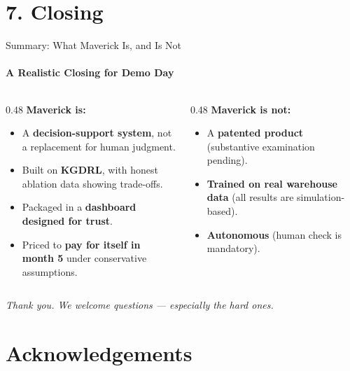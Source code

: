 \documentclass{beamer}
\begin{document}
\section{7. Closing}

\begin{frame}{Summary: What Maverick Is, and Is Not}
  \framesubtitle{A Realistic Closing for Demo Day}
  \small

  \begin{columns}
    \begin{column}{0.48\textwidth}
      \textbf{Maverick \color{deepgreen}is:}
      \begin{itemize}
        \item A \textbf{decision-support system}, not a replacement for human judgment.
        \item Built on \textbf{KGDRL}, with honest ablation data showing trade-offs.
        \item Packaged in a \textbf{dashboard designed for trust}.
        \item Priced to \textbf{pay for itself in month 5} under conservative assumptions.
      \end{itemize}
    \end{column}
    \begin{column}{0.48\textwidth}
      \textbf{Maverick \color{deepred}is not:}
      \begin{itemize}
        \item A \textbf{patented product} (substantive examination pending).
        \item \textbf{Trained on real warehouse data} (all results are simulation-based).
        \item \textbf{Autonomous} (human check is mandatory).
      \end{itemize}
    \end{column}
  \end{columns}

  \vspace{0.3cm}
  \centering
  \textit{Thank you. We welcome questions --- especially the hard ones.}
\end{frame}

\section*{Acknowledgements}
\end{document}
